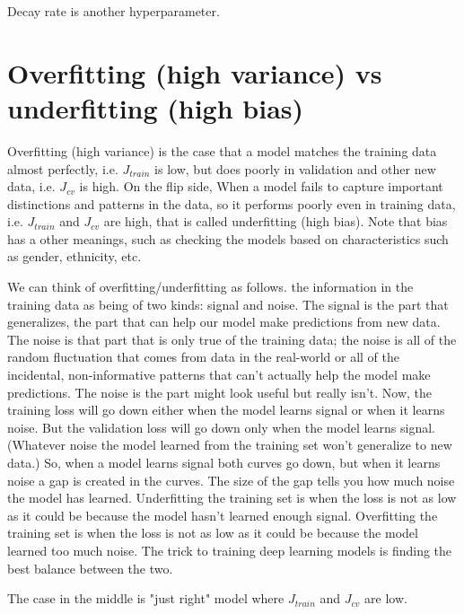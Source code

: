 \documentclass[12pt]{report}
\begin{document}
Decay rate is another hyperparameter.

\section{Overfitting (high variance) vs underfitting (high bias)}
Overfitting (high variance) is the case that a model matches the training data almost perfectly, i.e.  $J_{train}$ is low, but does poorly in validation and other new data, i.e. $J_{cv}$ is high. On the flip side, When a model fails to capture important distinctions and patterns in the data, so it performs poorly even in training data, i.e. $J_{train}$ and $J_{cv}$ are high, that is called underfitting (high bias). Note that bias has a other meanings, such as checking the models based on characteristics such as gender, ethnicity, etc.

We can think of overfitting/underfitting as follows. the information in the training data as being of two kinds: signal and noise. The signal is the part that generalizes, the part that can help our model make predictions from new data. The noise is that part that is only true of the training data; the noise is all of the random fluctuation that comes from data in the real-world or all of the incidental, non-informative patterns that can't actually help the model make predictions. The noise is the part might look useful but really isn't. Now, the training loss will go down either when the model learns signal or when it learns noise. But the validation loss will go down only when the model learns signal. (Whatever noise the model learned from the training set won't generalize to new data.) So, when a model learns signal both curves go down, but when it learns noise a gap is created in the curves. The size of the gap tells you how much noise the model has learned. Underfitting the training set is when the loss is not as low as it could be because the model hasn't learned enough signal. Overfitting the training set is when the loss is not as low as it could be because the model learned too much noise. The trick to training deep learning models is finding the best balance between the two.




The case in the middle is "just right" model where $J_{train}$ and $J_{cv}$ are low.
\end{document}
